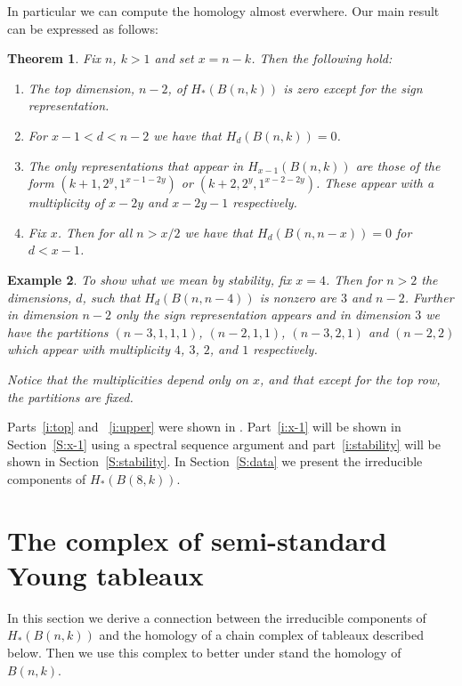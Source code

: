 \documentclass{elsart}
\newtheorem{theorem}{Theorem}[section]
\newtheorem{example}[theorem]{Example}
\begin{document}
In particular we can compute the homology almost everwhere. Our main result can be expressed as follows:
\begin{theorem} \label{T:main} Fix $n$, $k>1$ and set $x=n-k$. Then the following hold:
  \begin{enumerate}
    \item \label{i:top} The top dimension, $n-2$, of $H_*(B(n, k))$ is zero except for the sign representation.
    \item \label{i:upper} For $x-1 < d < n-2$ we have that $H_d(B(n, k))=0$.
    \item \label{i:x-1} The only representations that appear in $H_{x-1}(B(n, k))$ are those of the form 
          $(k+1, 2^y, 1^{x-1-2y})$ or
          $(k+2, 2^y, 1^{x-2-2y})$. These appear with a multiplicity of $x-2y$ and $x-2y-1$ respectively.
    \item \label{i:stability} Fix $x$. Then for all $n > x/2$ we have that $H_d(B(n, n-x)) = 0$ for $d < x - 1$.
  \end{enumerate}
\end{theorem}

\begin{example}
  To show what we mean by stability, fix $x=4$. Then for $n> 2$ the dimensions, $d$,  such that $H_d(B(n, n-4))$ is nonzero 
  are $3$ and $n-2$. Further
  in dimension $n-2$ only the sign representation appears and in dimension $3$ we have the partitions
  $(n-3, 1, 1, 1)$, $(n-2, 1, 1)$, $(n-3, 2, 1)$ and $(n-2, 2)$ which appear with multiplicity $4$, $3$, $2$, and $1$
  respectively.
  
  Notice that the multiplicities depend only on $x$, and that except for the top row, the partitions are fixed.
\end{example}

Parts~\ref{i:top} and ~\ref{i:upper} were shown in \cite{S1}. Part~\ref{i:x-1} will be shown in Section~\ref{S:x-1} using 
a spectral sequence argument and part~\ref{i:stability} will be shown in Section~\ref{S:stability}. In Section~\ref{S:data}
we present the irreducible components of $H_*(B(8, k))$. 


\section{The complex of semi-standard Young tableaux}

In this section we derive a connection between the irreducible components of $H_*(B(n, k))$ and the homology of a chain
complex of tableaux described below. Then we use this complex to better under stand the homology of $B(n, k)$.
\end{document}
